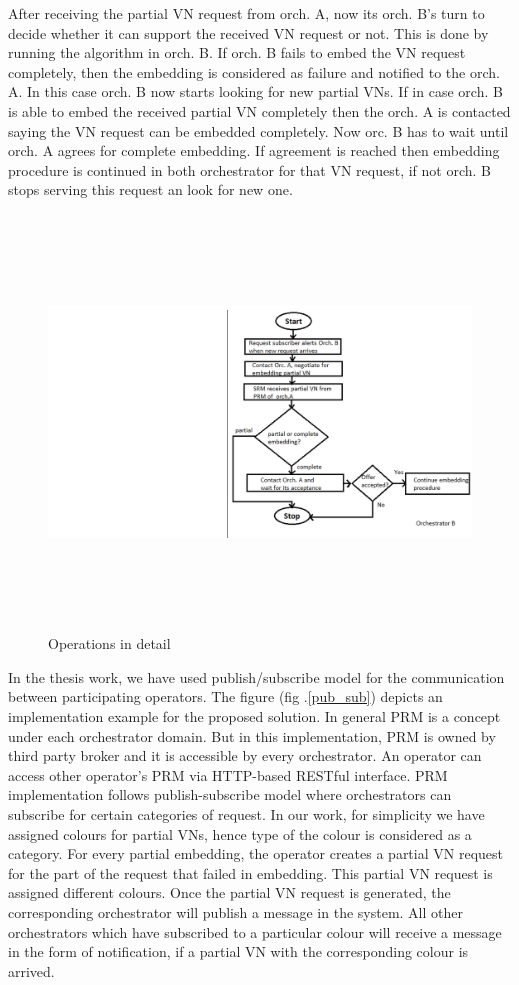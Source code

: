 \documentclass[article,dr=phil,type=msc ,colorback,accentcolor=tud4b]{tudthesis}
\begin{document}
After receiving the partial VN request from orch. A, now its orch. B's turn to decide whether it can support the received VN request or not. This is done by running the algorithm in orch. B. If orch. B fails to embed the VN request completely, then the embedding is considered as failure and notified to the orch. A. In this case orch. B now starts looking for new partial VNs. If in case orch. B is able to embed the received partial VN completely then the orch. A is contacted saying the VN request can be embedded completely. Now orc. B has to wait until orch. A agrees for complete embedding. If agreement is reached then embedding procedure is continued in both orchestrator for that VN request, if not orch. B stops serving this request an look for new one.\newline   
\begin{figure}[h]
	\centering
	\includegraphics[width=\linewidth, height=11cm]{flowchart1.png}
	\caption{Operations in detail}
	\label{fl}
\end{figure}

In the thesis work, we have used publish/subscribe model for the communication between participating operators. The figure (fig .\ref{pub_sub}) depicts an implementation example for the proposed solution. In general PRM is a concept under each orchestrator domain. But in this implementation, PRM is owned by third party broker and it is accessible by every orchestrator. An operator can access other operator's PRM via HTTP-based RESTful interface. PRM implementation follows publish-subscribe model where orchestrators can subscribe for certain categories of request. In our work, for simplicity we have assigned colours for partial VNs, hence type of the colour is considered as a category. For every partial embedding, the operator creates a partial VN request for the part of the request that failed in embedding. This partial VN request is assigned different colours. Once the partial VN request is generated, the corresponding orchestrator will publish a message in the system. All other orchestrators which have subscribed to a particular colour will receive a message in the form of notification, if a partial VN with the corresponding colour is arrived. \newline
\end{document}
